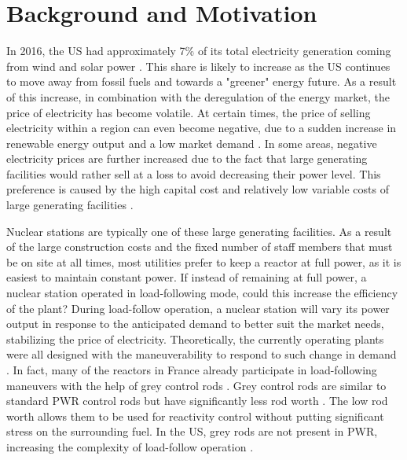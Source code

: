 \documentclass[edeposit,fullpage,11pt]{uiucthesis2009}
\begin{document}
\section{Background and Motivation}

In 2016, the \gls{US} had approximately 7\% of its total electricity generation coming from wind and solar power \cite{u.s_energy_information_administration_electricity_2016}. 
This share is likely to increase as the \gls{US} continues to move away from fossil fuels and towards a "greener" energy future.
As a result of this increase, in combination with the deregulation of the energy market, the price of electricity has become volatile. 
At certain times, the price of selling electricity within a region can even become negative, due to a sudden increase in renewable energy output and a low market demand \cite{paraschiv_impact_2014}. 
In some areas, negative electricity prices are further increased due to the fact that large generating facilities would rather sell at a loss to avoid decreasing their power level. 
This preference is caused by the high capital cost and relatively low variable costs of large generating facilities \cite{lokhov_load-following_2011}.

Nuclear stations are typically one of these large generating facilities.
As a result of the large construction costs and the fixed number of staff members that must be on site at all times, most utilities prefer to keep a reactor at full power, as it is easiest to maintain constant power. 
If instead of remaining at full power, a nuclear station operated in load-following mode, could this increase the efficiency of the plant?
During load-follow operation, a nuclear station will vary its power output in response to the anticipated demand to better suit the market needs, stabilizing the price of electricity.
Theoretically, the currently operating plants were all designed with the maneuverability to respond to such change in demand \cite{lokhov_technical_2011}.
In fact, many of the reactors in France already participate in load-following maneuvers with the help of grey control rods \cite{lokhov_technical_2011}.
Grey control rods are similar to standard \gls{PWR} control rods but have significantly less rod worth \cite{yousefpour_improvement_2000}.
The low rod worth allows them to be used for reactivity control without putting significant stress on the surrounding fuel. 
In the \gls{US}, grey rods are not present in \gls{PWR}, increasing the complexity of load-follow operation \cite{lokhov_technical_2011}.
  
\end{document}
